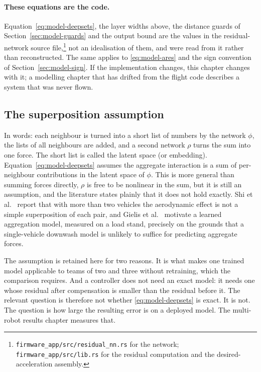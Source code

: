 \paragraph{These equations are the code.} Equation~\eqref{eq:model-deepsets}, the layer widths
above, the distance guards of Section~\ref{sec:model-guards} and the output bound are the values
in the residual-network source file,\footnote{\texttt{firmware\_app/src/residual\_nn.rs} for the
network; \texttt{firmware\_app/src/lib.rs} for the residual computation and the
desired-acceleration assembly.} not an idealisation of them, and were read from it rather than
reconstructed. The same applies to \eqref{eq:model-ares} and the sign convention of
Section~\ref{sec:model-sign}. If the implementation changes,
this chapter changes with it; a modelling chapter that has drifted from the flight code describes a
system that was never flown.

\subsection{The superposition assumption}
\label{sec:model-superposition}

In words: each neighbour is turned into a short list of numbers by the network $\phi$, the lists of
all neighbours are added, and a second network $\rho$ turns the sum into one force. The short list
is called the latent space (or embedding). Equation~\eqref{eq:model-deepsets} assumes the aggregate
interaction is a sum of per-neighbour contributions in the latent space of $\phi$. This is more general than summing forces directly,
$\rho$ is free to be nonlinear in the sum, but it is still an assumption, and the literature
states plainly that it does not hold exactly. Shi et al.~\cite{shi2020neuralswarm} report that with
more than two vehicles the aerodynamic effect is not a simple superposition of each pair, and Gielis
et al.~\cite{gielis2023aggregate} motivate a learned aggregation model, measured on a load stand,
precisely on the grounds that a single-vehicle downwash model is unlikely to suffice for predicting
aggregate forces.

The assumption is retained here for two reasons. It is what makes one trained model applicable to
teams of two and three without retraining, which the comparison requires. And a controller does not
need an exact model: it needs one whose residual after compensation is smaller than the residual
before it. The relevant question is therefore not whether \eqref{eq:model-deepsets} is exact. It is not.
The question is how large the resulting error is on a deployed model. The multi-robot results
chapter measures that.

